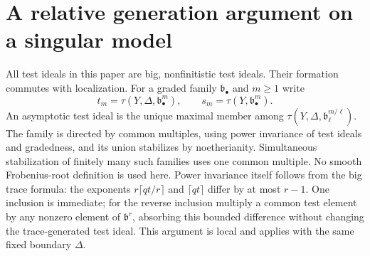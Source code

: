 \documentclass[11pt]{article}
\begin{document}
\section{A relative generation argument on a singular model}
All test ideals in this paper are big, nonfinitistic test ideals. Their
formation commutes with localization. For a graded family $\mathfrak b_\bullet$
and $m\geq1$ write
\[
 t_m=\tau(Y,\Delta,\mathfrak b_\bullet^m),\qquad
 s_m=\tau(Y,\mathfrak b_\bullet^m).
\]
An asymptotic test ideal is the unique maximal member among
$\tau(Y,\Delta,\mathfrak b_\ell^{m/\ell})$.
The family is directed by common multiples, using power invariance of test
ideals and gradedness, and its union stabilizes by noetherianity.
Simultaneous stabilization of finitely many such families uses one common
multiple. No smooth Frobenius-root definition is used here.
Power invariance itself follows from the big trace formula: the exponents
$r\lceil qt/r\rceil$ and $\lceil qt\rceil$ differ by at most $r-1$.
One inclusion is immediate; for the reverse inclusion multiply a common
test element by any nonzero element of $\mathfrak b^r$, absorbing this
bounded difference without changing the trace-generated test ideal.
This argument is local and applies with the same fixed boundary $\Delta$.
\end{document}
